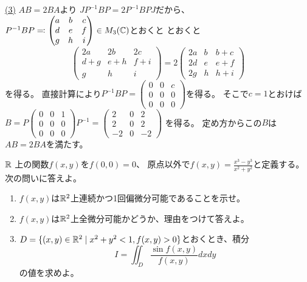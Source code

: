 \documentclass[report]{jlreq}
\begin{document}
\begin{answer}
    \uline{(3)} \quad
    $AB = 2BA$より
    $JP^{-1}BP = 2P^{-1}BPJ$だから、
    $P^{-1}BP \eqqcolon \begin{pmatrix}
        a & b & c \\
        d & e & f \\
        g & h & i
    \end{pmatrix} \in M_3(\mathbb{C})$とおくと
    とおくと
    \begin{equation}
        \begin{pmatrix}
            2a & 2b & 2c \\
            d+g & e+h & f+i \\
            g & h & i
        \end{pmatrix}
            = 2 \begin{pmatrix}
                2a & b & b+c \\
                2d & e & e+f \\
                2g & h & h+i
            \end{pmatrix}
    \end{equation}
    を得る。
    直接計算により$P^{-1}BP = \begin{pmatrix}
        0 & 0 & c \\
        0 & 0 & 0 \\
        0 & 0 & 0
    \end{pmatrix}$を得る。
    そこで$c = 1$とおけば
    $B
        = P \begin{pmatrix}
            0 & 0 & 1 \\
            0 & 0 & 0 \\
            0 & 0 & 0
        \end{pmatrix} P^{-1}
        = \begin{pmatrix}
            2 & 0 & 2 \\
            2 & 0 & 2 \\
            -2 & 0 & -2
        \end{pmatrix}$
    を得る。
    定め方からこの$B$は$AB = 2BA$を満たす。
\end{answer}

\begin{problem}[第2問]
    $\mathbb{R}$ 上の関数$f(x,y)$を$f(0,0) = 0$、
    原点以外で$f(x,y) = \frac{x^3 - y^3}{x^2 + y^2}$と定義する。次の問いに答えよ。
    \begin{enumerate}
        \item $f(x,y)$は$\mathbb{R}^2$上連続かつ1回偏微分可能であることを示せ。
        \item $f(x,y)$は$\mathbb{R}^2$上全微分可能かどうか、理由をつけて答えよ。
        \item $D = \{(x,y) \in \mathbb{R}^2 \mid x^2 + y^2 < 1, f(x,y) > 0\}$とおくとき、積分
            \begin{equation}
                I = \iint_D \frac{\sin f(x,y)}{f(x,y)} dxdy
            \end{equation}
            の値を求めよ。
    \end{enumerate}
\end{problem}
\end{document}
